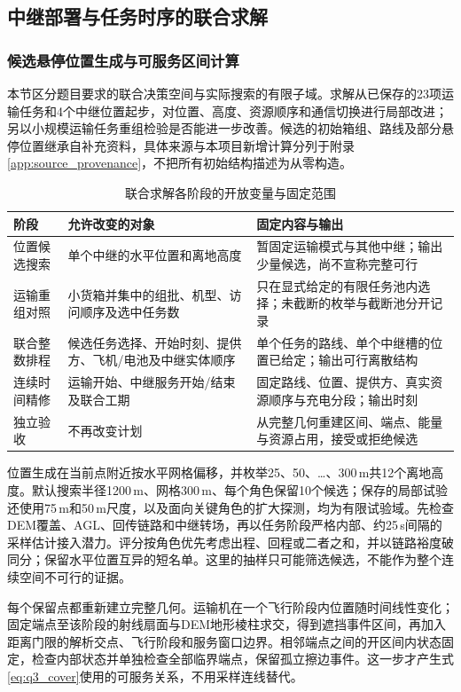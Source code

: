 \subsection{中继部署与任务时序的联合求解}
\subsubsection{候选悬停位置生成与可服务区间计算}
本节区分题目要求的联合决策空间与实际搜索的有限子域。求解从已保存的23项运输任务和4个中继位置起步，对位置、高度、资源顺序和通信切换进行局部改进；另以小规模运输任务重组检验是否能进一步改善。候选的初始箱组、路线及部分悬停位置继承自补充资料，具体来源与本项目新增计算分列于附录\ref{app:source_provenance}，不把所有初始结构描述为从零构造。

\begin{table}[htbp]\centering\small
\caption{联合求解各阶段的开放变量与固定范围}\label{tab:q3_decision_scope}
\begin{tabularx}{\linewidth}{p{2.4cm}XX}\toprule
阶段 & 允许改变的对象 & 固定内容与输出\\\midrule
位置候选搜索 & 单个中继的水平位置和离地高度 & 暂固定运输模式与其他中继；输出少量候选，尚不宣称完整可行\\
运输重组对照 & 小货箱并集中的组批、机型、访问顺序及选中任务数 & 只在显式给定的有限任务池内选择；未截断的枚举与截断池分开记录\\
联合整数排程 & 候选任务选择、开始时刻、提供方、飞机/电池及中继实体顺序 & 单个任务的路线、单个中继槽的位置已给定；输出可行离散结构\\
连续时间精修 & 运输开始、中继服务开始/结束及联合工期 & 固定路线、位置、提供方、真实资源顺序与充电分段；输出时刻\\
独立验收 & 不再改变计划 & 从完整几何重建区间、端点、能量与资源占用，接受或拒绝候选\\\bottomrule
\end{tabularx}
\end{table}

位置生成在当前点附近按水平网格偏移，并枚举25、50、\ldots、300\,m共12个离地高度。默认搜索半径1200\,m、网格300\,m、每个角色保留10个候选；保存的局部试验还使用75\,m和50\,m尺度，以及面向关键角色的扩大探测，均为有限试验域。先检查DEM覆盖、AGL、回传链路和中继转场，再以任务阶段严格内部、约25\,s间隔的采样估计接入潜力。评分按角色优先考虑出程、回程或二者之和，并以链路裕度破同分；保留水平位置互异的短名单。这里的抽样只可能筛选候选，不能作为整个连续空间不可行的证据。

每个保留点都重新建立完整几何。运输机在一个飞行阶段内位置随时间线性变化；固定端点至该阶段的射线扇面与DEM地形棱柱求交，得到遮挡事件区间，再加入距离门限的解析交点、飞行阶段和服务窗口边界。相邻端点之间的开区间内状态固定，检查内部状态并单独检查全部临界端点，保留孤立擦边事件。这一步才产生式\eqref{eq:q3_cover}使用的可服务关系，不用采样连线替代。


